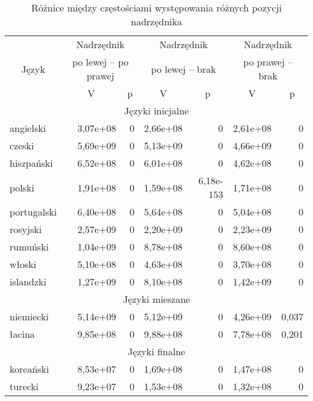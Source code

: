 \begin{table}[h!]
\centering
\begin{tabular}{lrrrrrr}
  \toprule
		& \multicolumn{2}{c}{Nadrzędnik} & \multicolumn{2}{c}{Nadrzędnik} & \multicolumn{2}{c}{Nadrzędnik}	\\
\multicolumn{1}{c}{Język} & \multicolumn{2}{c}{po lewej -- po prawej} & \multicolumn{2}{c}{po lewej -- brak} & \multicolumn{2}{c}{po prawej -- brak} \\
		& \multicolumn{1}{c}{V} & \multicolumn{1}{c}{p} & \multicolumn{1}{c}{V} & \multicolumn{1}{c}{p} & \multicolumn{1}{c}{V} & \multicolumn{1}{c}{p} \\
\midrule
\multicolumn{7}{c}{Języki inicjalne} \\
\midrule
angielski	& 3,07e+08 & 0 & 2,66e+08 & 0 & 2,61e+08 & 0 \\ 
czeski		& 5,69e+09 & 0 & 5,13e+09 & 0 & 4,66e+09 & 0 \\ 
hiszpański	& 6,52e+08 & 0 & 6,01e+08 & 0 & 4,62e+08 & 0 \\  
polski		& 1,91e+08 & 0 & 1,59e+08 & 6,18e-153 & 1,71e+08 & 0 \\ 
portugalski	& 6,40e+08 & 0 & 5,64e+08 & 0 & 5,04e+08 & 0 \\ 
rosyjski		& 2,57e+09 & 0 & 2,20e+09 & 0 & 2,23e+09 & 0 \\ 
rumuński		& 1,04e+09 & 0 & 8,78e+08 & 0 & 8,60e+08 & 0 \\ 
włoski		& 5,10e+08 & 0 & 4,63e+08 & 0 & 3,70e+08 & 0 \\
\hdashline
islandzki	& 1,27e+09 & 0 & 8,10e+08 & 0 & 1,42e+09 & 0 \\ 
\midrule
\multicolumn{7}{c}{Języki mieszane} \\
\midrule
niemiecki	& 5,14e+09 & 0 & 5,12e+09 & 0 & 4,26e+09 & 0,037 \\ 
łacina		& 9,85e+08 & 0 & 9,88e+08 & 0 & 7,78e+08 & 0,201 \\ 
\midrule
\multicolumn{7}{c}{Języki finalne} \\
\midrule
koreański	& 8,53e+07 & 0 & 1,69e+08 & 0 & 1,47e+08 & 0 \\ 
turecki		& 9,23e+07 & 0 & 1,53e+08 & 0 & 1,32e+08 & 0 \\ 
   \bottomrule
\end{tabular}
\label{tab:stat}
\caption{Różnice między częstościami występowania różnych pozycji nadrzędnika}
\end{table}